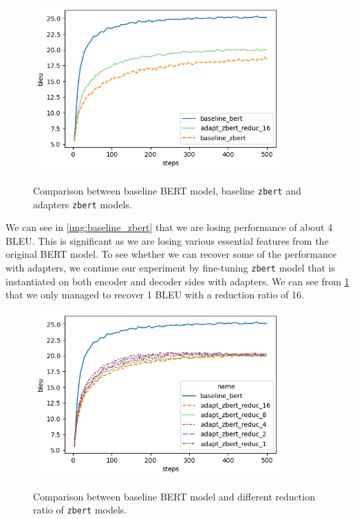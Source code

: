 \begin{figure}[]
    {\includegraphics[width=0.85\textwidth]{img/adapter_zbert.png}}
    \centering
    \caption{Comparison between baseline BERT model, baseline \texttt{zbert} and adapters \texttt{zbert} models.}
    \label{img:adapter_zbert}
\end{figure}

We can see in \cref{img:baseline_zbert} that we are losing performance of about 4 BLEU. This is significant as we are losing various essential features from the original BERT model. To see whether we can recover some of the performance with adapters, we continue our experiment by fine-tuning \texttt{zbert} model that is instantiated on both encoder and decoder sides with adapters. We can see from \cref{img:adapter_zbert} that we only managed to recover 1 BLEU with a reduction ratio of 16.

\begin{figure}[]
    {\includegraphics[width=0.85\textwidth]{img/adapter_zbert_ratio.png}}
    \centering
    \caption{Comparison between baseline BERT model and different reduction ratio of \texttt{zbert} models.}
    \label{img:adapter_zbert_ratio}
\end{figure}

